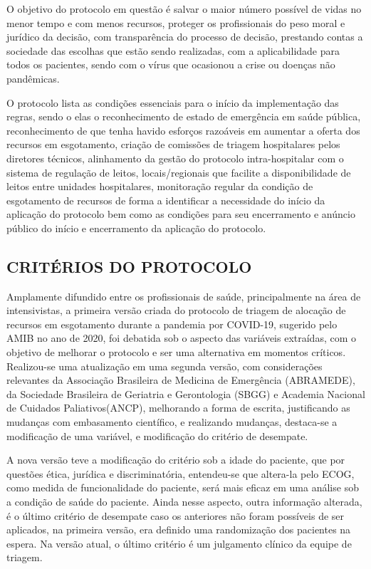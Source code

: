 \documentclass[12pt]{article}
\begin{document}
O objetivo do protocolo em questão é salvar o maior número possível de vidas no menor tempo e com menos recursos, proteger os profissionais do peso moral e jurídico da decisão, com transparência do processo de decisão, prestando contas a sociedade das escolhas que estão sendo realizadas, com a aplicabilidade para todos os pacientes, sendo com o vírus que ocasionou a crise ou doenças não pandêmicas.

O protocolo lista as condições essenciais para o início da implementação das regras, sendo o elas o reconhecimento de estado de emergência em saúde pública, reconhecimento de que tenha havido esforços razoáveis em aumentar a oferta dos recursos em esgotamento, criação de comissões de triagem hospitalares pelos diretores técnicos, alinhamento da gestão do protocolo intra-hospitalar com o sistema de regulação de leitos, locais/regionais que facilite a disponibilidade de leitos entre unidades hospitalares, monitoração regular da condição de esgotamento de recursos de forma a identificar a necessidade do início da aplicação do protocolo bem como as condições para seu encerramento e anúncio público do início e encerramento da aplicação do protocolo.

\subsection{CRITÉRIOS DO PROTOCOLO}

Amplamente difundido entre os profissionais de saúde, principalmente na área de intensivistas, a primeira versão criada do protocolo de triagem de alocação de recursos em esgotamento durante a pandemia por COVID-19, sugerido pelo AMIB no ano de 2020, foi debatida sob o aspecto das variáveis extraídas, com o objetivo de melhorar o protocolo e ser uma alternativa em momentos críticos. Realizou-se uma atualização em uma segunda versão, com considerações relevantes da Associação Brasileira de Medicina de Emergência (ABRAMEDE), da Sociedade Brasileira de Geriatria e Gerontologia (SBGG) e Academia Nacional de Cuidados Paliativos(ANCP), melhorando a forma de escrita, justificando as mudanças com embasamento científico, e realizando mudanças, destaca-se a modificação de uma variável, e modificação do critério de desempate.

A nova versão teve a modificação do critério sob a idade do paciente, que por questões ética, jurídica e discriminatória, entendeu-se que altera-la pelo ECOG, como medida de funcionalidade do paciente, será mais eficaz em uma análise sob a condição de saúde do paciente.
Ainda nesse aspecto, outra informação alterada, é o último critério de desempate caso os anteriores não foram possíveis de ser aplicados, na primeira versão, era definido uma randomização dos pacientes na espera. Na versão atual, o último critério é um julgamento clínico da equipe de triagem.
\end{document}

